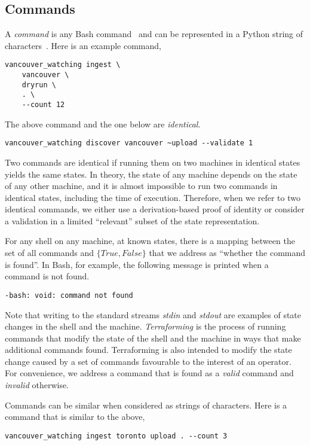 \subsection{Commands}
\label{commands}

A \emph{command} is any Bash command~ and can be represented in a Python string of characters~. Here is an example command,
%
\begin{verbatim}
vancouver_watching ingest \
    vancouver \
    dryrun \
    . \
    --count 12
\end{verbatim}
%
The above command and the one below are \emph{identical}.
%
\begin{verbatim}
vancouver_watching discover vancouver ~upload --validate 1
\end{verbatim}
%
Two commands are identical if running them on two machines in identical states yields the same states. In theory, the state of any machine depends on the state of any other machine, and it is almost impossible to run two commands in identical states, including the time of execution. Therefore, when we refer to two identical commands, we either use a derivation-based proof of identity or consider a validation in a limited ``relevant'' subset of the state representation.

For any shell on any machine, at known states, there is a mapping between the set of all commands and $\{True,False\}$ that we address as ``whether the command is found''. In Bash, for example, the following message is printed when a command is not found.
%
\begin{verbatim}
-bash: void: command not found
\end{verbatim}
%
Note that writing to the standard streams \emph{stdin} and \emph{stdout} are examples of state changes in the shell and the machine. \emph{Terraforming} is the process of running commands that modify the state of the shell and the machine in ways that make additional commands found. Terraforming is also intended to modify the state change caused by a set of commands favourable to the interest of an operator. For convenience, we address a command that is found as a \emph{valid} command and \emph{invalid} otherwise.

Commands can be similar when considered as strings of characters. Here is a command that is similar to the above,
%
\begin{verbatim}
vancouver_watching ingest toronto upload . --count 3
\end{verbatim}

